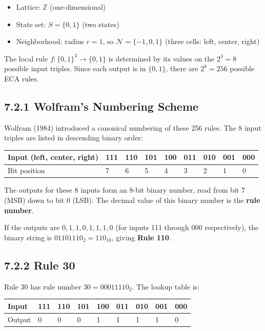 \begin{itemize}
  \item Lattice: $\mathbb{Z}$ (one-dimensional)
  \item State set: $S = \{ 0, 1\} $ (two states)
  \item Neighborhood: radius $r = 1$, so $\mathcal{N} = \{ -1, 0, 1\} $ (three cells: left, center, right)
\end{itemize}

The local rule $f: \{ 0,1\} ^3 \to \{ 0,1\} $ is determined by its values on the $2^3 = 8$ possible input triples. Since each output is in $\{ 0,1\} $, there are $2^8 = 256$ possible ECA rules.

\subsection{7.2.1 Wolfram's Numbering Scheme}

Wolfram (1984) introduced a canonical numbering of these 256 rules. The 8 input triples are listed in descending binary order:

\begin{tabular}{|l|l|l|l|l|l|l|l|l|}
\hline
Input (left, center, right) & 111 & 110 & 101 & 100 & 011 & 010 & 001 & 000 \\
\hline
Bit position & 7 & 6 & 5 & 4 & 3 & 2 & 1 & 0 \\
\hline
\end{tabular}


The outputs for these 8 inputs form an 8-bit binary number, read from bit 7 (MSB) down to bit 0 (LSB). The decimal value of this binary number is the \textbf{rule number}.

\begin{example}
If the outputs are $0, 1, 1, 0, 1, 1, 1, 0$ (for inputs 111 through 000 respectively), the binary string is $01101110_2 = 110_{10}$, giving \textbf{Rule 110}.
\end{example}


\subsection{7.2.2 Rule 30}

Rule 30 has rule number $30 = 00011110_2$. The lookup table is:

\begin{tabular}{|l|l|l|l|l|l|l|l|l|}
\hline
Input & 111 & 110 & 101 & 100 & 011 & 010 & 001 & 000 \\
\hline
Output & 0 & 0 & 0 & 1 & 1 & 1 & 1 & 0 \\
\hline
\end{tabular}


